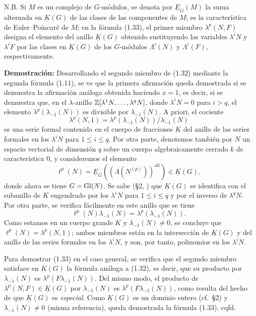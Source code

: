 N.B. Si $M$ es un complejo de $G$-módulos, se denota por $\underline{E}_G(M)$ la suma alternada en $\underline{K}(G)$ de las clases de las componentes de $M$; es la característica de Euler--Poincaré de $M$; en la fórmula (1.33), el primer miembro $\lambda^p(N,F)$ designa el elemento del anillo $\underline{K}(G)$ obtenido sustituyendo las variables $\lambda^iN$ y $\lambda^iF$ por las clases en $\underline{K}(G)$ de los $G$-módulos $\Lambda^i(N)$ y $\Lambda^i(F)$, respectivamente.

\textbf{Demostración:} Desarrollando el segundo miembro de (1.32) mediante la segunda fórmula (1.11), se ve que la primera afirmación queda demostrada si se demuestra la afirmación análoga obtenida haciendo $x=1$, es decir, si se demuestra que, en el $\lambda$-anillo $\mathbb Z[\lambda^1N,\ldots,\lambda^qN]$, donde $\lambda^iN=0$ para $i>q$, el elemento $\lambda^p(\lambda_{-1}(N))$ es divisible por $\lambda_{-1}(N)$. A priori, el cociente
\[
\lambda^p(N,1)=\lambda^p(\lambda_{-1}(N))/\lambda_{-1}(N)
\]
es una serie formal contenida en el cuerpo de fracciones $K$ del anillo de las series formales en los $\lambda^iN$ para $1\leq i\leq q$. Por otra parte, denotemos también por $N$ un espacio vectorial de dimensión $q$ sobre un cuerpo algebraicamente cerrado $k$ de característica $0$, y consideremos el elemento
\[
\ell^p(N)=\underline{E}_G((\Lambda(N^{(p)}))^{\mathrm{alt}})\in \underline{K}(G),
\]
donde ahora se tiene $G=\operatorname{Gl}(N)$. Se sabe (\S 2, ) que $\underline{K}(G)$ se identifica con el subanillo de $K$ engendrado por los $\lambda^iN$ para $1\leq i\leq q$ y por el inverso de $\lambda^qN$. Por otra parte, se verifica fácilmente en este anillo que se tiene
\[
\ell^p(N)\lambda_{-1}(N)=\lambda^p(\lambda_{-1}(N)).
\]
Como estamos en un cuerpo grande $K$ y $\lambda_{-1}(N)\neq0$, se concluye que $\ell^p(N)=\lambda^p(N,1)$; ambos miembros están en la intersección de $\underline{K}(G)$ y del anillo de las series formales en los $\lambda^iN$, y son, por tanto, polinomios en los $\lambda^iN$.

Para demostrar (1.33) en el caso general, se verifica que el segundo miembro satisface en $\underline{K}(G)$ la fórmula análoga a (1.32), es decir, que su producto por $\lambda_{-1}(N)$ es $\lambda^p(F\lambda_{-1}(N))$. Del mismo modo, el producto de $\lambda^p(N,F)\in \underline{K}(G)$ por $\lambda_{-1}(N)$ es $\lambda^p(F\lambda_{-1}(N))$, como resulta del hecho de que $\underline{K}(G)$ es \emph{especial}. Como $\underline{K}(G)$ es un dominio entero (cf.\ \S 2) y $\lambda_{-1}(N)\neq0$ (misma referencia), queda demostrada la fórmula (1.33). cqfd.

